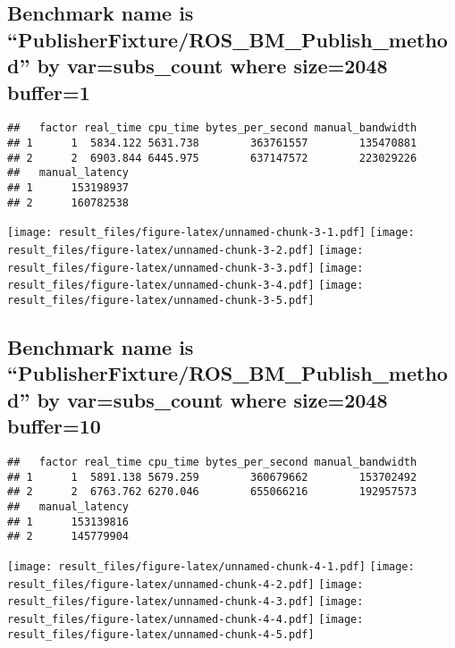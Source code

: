 \documentclass[]{article}
\begin{document}
\hypertarget{benchmark-name-is-publisherfixtureros_bm_publish_method-by-varsubs_count-where-size2048-buffer1}{%
\subsection{Benchmark name is
``PublisherFixture/ROS\_BM\_Publish\_method'' by var=subs\_count where
size=2048
buffer=1}\label{benchmark-name-is-publisherfixtureros_bm_publish_method-by-varsubs_count-where-size2048-buffer1}}

\begin{verbatim}
##   factor real_time cpu_time bytes_per_second manual_bandwidth
## 1      1  5834.122 5631.738        363761557        135470881
## 2      2  6903.844 6445.975        637147572        223029226
##   manual_latency
## 1      153198937
## 2      160782538
\end{verbatim}

\texttt{[image: result\_files/figure-latex/unnamed-chunk-3-1.pdf]}
\texttt{[image: result\_files/figure-latex/unnamed-chunk-3-2.pdf]}
\texttt{[image: result\_files/figure-latex/unnamed-chunk-3-3.pdf]}
\texttt{[image: result\_files/figure-latex/unnamed-chunk-3-4.pdf]}
\texttt{[image: result\_files/figure-latex/unnamed-chunk-3-5.pdf]}

\hypertarget{benchmark-name-is-publisherfixtureros_bm_publish_method-by-varsubs_count-where-size2048-buffer10}{%
\subsection{Benchmark name is
``PublisherFixture/ROS\_BM\_Publish\_method'' by var=subs\_count where
size=2048
buffer=10}\label{benchmark-name-is-publisherfixtureros_bm_publish_method-by-varsubs_count-where-size2048-buffer10}}

\begin{verbatim}
##   factor real_time cpu_time bytes_per_second manual_bandwidth
## 1      1  5891.138 5679.259        360679662        153702492
## 2      2  6763.762 6270.046        655066216        192957573
##   manual_latency
## 1      153139816
## 2      145779904
\end{verbatim}

\texttt{[image: result\_files/figure-latex/unnamed-chunk-4-1.pdf]}
\texttt{[image: result\_files/figure-latex/unnamed-chunk-4-2.pdf]}
\texttt{[image: result\_files/figure-latex/unnamed-chunk-4-3.pdf]}
\texttt{[image: result\_files/figure-latex/unnamed-chunk-4-4.pdf]}
\texttt{[image: result\_files/figure-latex/unnamed-chunk-4-5.pdf]}
\end{document}
